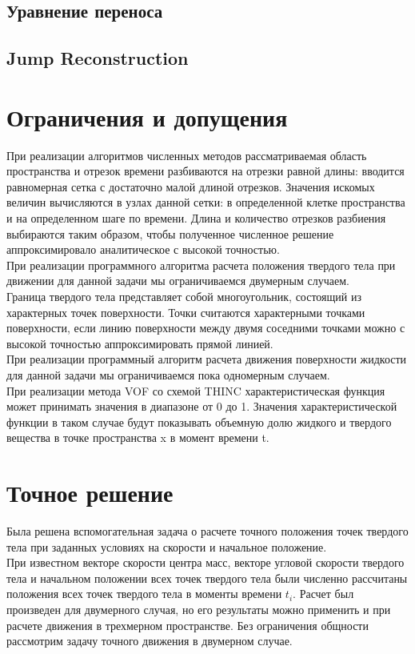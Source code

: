 \documentclass[12pt,a4paper]{article}
\begin{document}
\subsection{Уравнение переноса}
\subsection{Jump Reconstruction}

\section{Ограничения и допущения}
При реализации алгоритмов численных методов рассматриваемая область пространства и отрезок времени разбиваются на отрезки равной длины: вводится равномерная сетка с достаточно малой длиной отрезков. Значения искомых величин вычисляются в узлах данной сетки: в определенной клетке пространства и на определенном шаге по времени. Длина и количество отрезков разбиения выбираются таким образом, чтобы полученное численное решение аппроксимировало аналитическое с высокой точностью.\\
При реализации программного алгоритма расчета положения твердого тела при движении для данной задачи мы ограничиваемся двумерным случаем.\\
Граница твердого тела представляет собой многоугольник, состоящий из характерных точек поверхности. Точки считаются характерными точками поверхности, если линию поверхности между двумя соседними точками можно с высокой точностью аппроксимировать прямой линией.\\
При реализации программный алгоритм расчета движения поверхности жидкости для данной задачи мы ограничиваемся пока одномерным случаем. \\
При реализации метода VOF со схемой THINC характеристическая функция может принимать значения в диапазоне от 0 до 1. Значения характеристической функции в таком случае будут показывать объемную долю жидкого и твердого вещества в точке пространства x в момент времени t.\\

\section{Точное решение}
Была решена вспомогательная задача о расчете точного положения точек твердого тела при заданных условиях на скорости и начальное положение.\\
При известном векторе скорости центра масс, векторе угловой скорости твердого тела и начальном положении всех точек твердого тела были численно рассчитаны положения всех точек твердого тела в моменты времени $t_i$.
Расчет был произведен для двумерного случая, но его результаты можно применить и при расчете движения в трехмерном пространстве.
Без ограничения общности рассмотрим задачу точного движения в двумерном случае.
\end{document}
